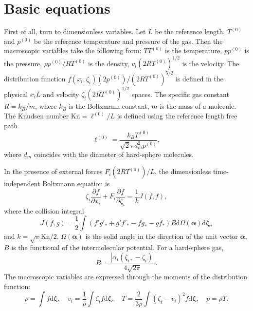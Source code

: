 \documentclass[10pt]{article}
\newcommand{\Kn}{\mathrm{Kn}}
\newcommand{\dd}{\mathrm{d}}
\newcommand{\pder}[2][]{\frac{\partial#1}{\partial#2}}
\newcommand{\dzeta}{\boldsymbol{\dd\zeta}}
\begin{document}
\section{Basic equations}

First of all, turn to dimensionless variables.
Let \(L\) be the reference length, \(T^{(0)}\) and \(p^{(0)}\) be the reference temperature and pressure of the gas.
Then the macroscopic variables take the following form: \(TT^{(0)}\) is the temperature,
\(pp^{(0)}\) is the pressure, \(\rho p^{(0)}/RT^{(0)}\) is the density, \(v_i(2RT^{(0)})^{1/2}\) is the velocity.
The distribution function \(f(x_i,\zeta_i)(2p^{(0)})/(2RT^{(0)})^{5/2}\) is defined
in the physical \(x_iL\) and velocity \(\zeta_i(2RT^{(0)})^{1/2}\) spaces.
The specific gas constant \(R = k_B/m\), where \(k_B\) is the Boltzmann constant, \(m\) is the mass of a molecule.
The Knudsen number \(\Kn = \ell^{(0)}/L\) is defined using the reference length free path
\begin{equation}\label{eq:ell}
    \ell^{(0)} = \frac{k_B T^{(0)}}{\sqrt2\pi d_m^2 p^{(0)}},
\end{equation}
where \(d_m\) coincides with the diameter of hard-sphere molecules.

In the presence of external forces \(F_i (2RT^{(0)})/L\), the dimensionless time-independent Boltzmann equation is
\begin{equation}\label{eq:Boltzmann}
    \zeta_i\pder[f]{x_i} + F_i\pder[f]{\zeta_i} = \frac1k J(f,f),
\end{equation}
where the collision integral
\begin{equation}\label{eq:integral}
    J(f,g) = \frac12 \int(f'g'_*+g'f'_*-fg_*-gf_*)B\dd\Omega(\boldsymbol\alpha) \dzeta_*
\end{equation}
and \(k = \sqrt\pi\Kn/2\).
\(\Omega(\boldsymbol{\alpha})\) is the solid angle in the direction of the unit vector \(\boldsymbol\alpha\),
\(B\) is the functional of the intermolecular potential. For a hard-sphere gas,
\begin{equation}\label{eq:ci_kernel}
    B = \frac{|\alpha_i(\zeta_{i*}-\zeta_i)|}{4\sqrt{2\pi}}.
\end{equation}
The macroscopic variables are expressed through the moments of the distribution function:
\begin{equation}\label{eq:macro}
    \rho = \int f \dzeta, \quad
    v_i = \frac1{\rho} \int \zeta_i f \dzeta, \quad
    T = \frac{2}{3\rho}\int(\zeta_i-v_i)^2 f \dzeta, \quad
    p = \rho T.
\end{equation}
\end{document}
